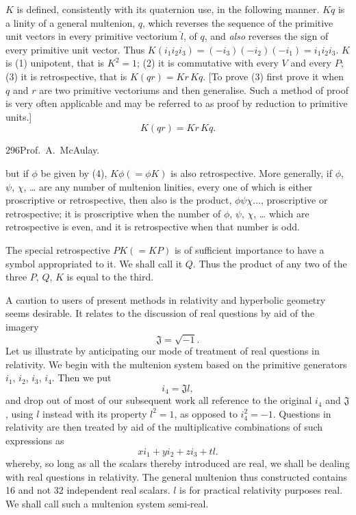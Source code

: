 \documentclass[11pt]{article}
\begin{document}
\indent $K$ is defined, consistently with its quaternion use, in the following manner. $Kq$ is a linity of a general multenion, $q$, which reverses the sequence of the primitive unit vectors in every primitive vectorium $\breve{l}$, of $q$, and \emph{also} reverses the sign of every primitive unit vector. Thus $K(i_1i_2i_3)=(-i_3)(-i_2)(-i_1)=i_1i_2i_3$. $K$ is (1) unipotent, that is $K^2=1$; (2) it is commutative with every $V$ and every $P$; (3) it is retrospective, that is $K(qr)=Kr\,Kq$. [To prove (3) first prove it when $q$ and $r$ are two primitive vectoriums and then generalise. Such a method of proof is very often applicable and may be referred to as proof by reduction to primitive units.]
\begin{equation}K(qr)=Kr\,Kq.\tag{5}\end{equation}

\newpage\thispagestyle{empty}\begin{center}296\hfill Prof.\ A.\ McAulay.\end{center}
but if $\phi$ be given by (4), $K\phi(=\phi K)$ is also retrospective. More generally, if $\phi$, $\psi$, $\chi$, \ldots{} are any number of multenion linities, every one of which is either proscriptive or retrospective, then also is the product, $\phi\psi\chi\ldots$, proscriptive or retrospective; it is proscriptive when the number of $\phi$, $\psi$, $\chi$, \ldots{} which are retrospective is even, and it is retrospective when that number is odd.

\indent The special retrospective $PK(=KP)$ is of sufficient importance to have a symbol appropriated to it. We shall call it $Q$. Thus the product of any two of the three $P$, $Q$, $K$ is equal to the third.

\indent A caution to users of present methods in relativity and hyperbolic geometry seems desirable. It relates to the discussion of real questions by aid of the imagery
\begin{equation}\mathfrak J=\sqrt{-1}.\tag{6}\end{equation}
\indent Let us illustrate by anticipating our mode of treatment of real questions in relativity. We begin with the multenion system based on the primitive generators $i_1$, $i_2$, $i_3$, $i_4$. Then we put
\begin{equation}i_4=\mathfrak Jl,\tag{7}\end{equation}
and drop out of most of our subsequent work all reference to the original $i_4$ and $\mathfrak J$, using $l$ instead with its property $l^2=1$, as opposed to $i_4^2=-1$. Questions in relativity are then treated by aid of the multiplicative combinations of such expressions as
\begin{equation}xi_1+yi_2+zi_3+tl.\tag{8}\end{equation}
whereby, so long as all the scalars thereby introduced are real, we shall be dealing with real questions in relativity. The general multenion thus constructed contains 16 and not 32 independent real scalars. $l$ is for practical relativity purposes real. We shall call such a multenion system semi-real.
\end{document}
